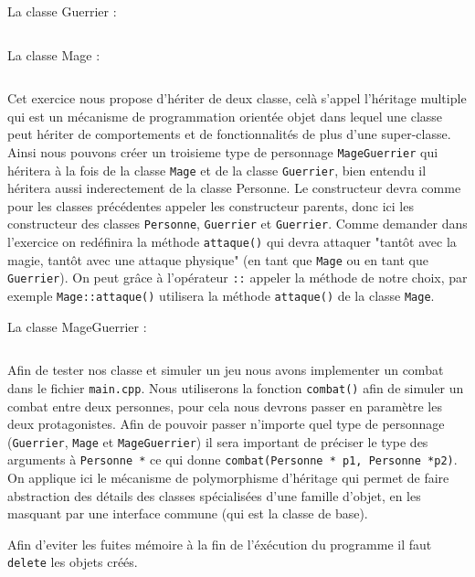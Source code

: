 La classe Guerrier :
\inputminted[linenos,firstline=12, lastline=23]{cpp}{../sources/cpp/TP9-10/Guerrier.h}

La classe Mage :
\inputminted[linenos,firstline=12, lastline=26]{cpp}{../sources/cpp/TP9-10/Mage.h}

Cet exercice nous propose d'hériter de deux classe, celà s'appel l'héritage multiple qui est un mécanisme de programmation orientée objet dans lequel une classe peut hériter de comportements et de fonctionnalités de plus d'une super-classe.
Ainsi nous pouvons créer un troisieme type de personnage \texttt{MageGuerrier} qui héritera à la fois de la classe \texttt{Mage} et de la classe \texttt{Guerrier}, bien entendu il héritera aussi inderectement de la classe Personne.
Le constructeur devra comme pour les classes précédentes appeler les constructeur parents, donc ici les constructeur des classes \texttt{Personne}, \texttt{Guerrier} et \texttt{Guerrier}.
Comme demander dans l'exercice on redéfinira la méthode \texttt{attaque()} qui devra attaquer "tantôt avec la magie, tantôt avec une attaque physique" (en tant que \texttt{Mage} ou en tant que \texttt{Guerrier}). On peut grâce à l'opérateur \texttt{::} appeler la méthode de notre choix, par exemple \texttt{Mage::attaque()} utilisera la méthode \texttt{attaque()} de la classe \texttt{Mage}.

La classe MageGuerrier :
\inputminted[linenos,firstline=7, lastline=21]{cpp}{../sources/cpp/TP9-10/MageGuerrier.cpp}

Afin de tester nos classe et simuler un jeu nous avons implementer un combat dans le fichier \texttt{main.cpp}.
Nous utiliserons la fonction \texttt{combat()} afin de simuler un combat entre deux personnes, pour cela nous devrons passer en paramètre les deux protagonistes.
Afin de pouvoir passer n'importe quel type de personnage (\texttt{Guerrier}, \texttt{Mage} et \texttt{MageGuerrier}) il sera important de préciser le type des arguments à \texttt{Personne *} ce qui donne \texttt{combat(Personne * p1, Personne *p2)}.
On applique ici le mécanisme de polymorphisme d'héritage qui permet de faire abstraction des détails des classes spécialisées d'une famille d'objet, en les masquant par une interface commune (qui est la classe de base).

Afin d'eviter les fuites mémoire à la fin de l'éxécution du programme il faut \texttt{delete} les objets créés.

\inputminted[linenos,firstline=43, lastline=62]{cpp}{../sources/cpp/TP9-10/main.cpp}
